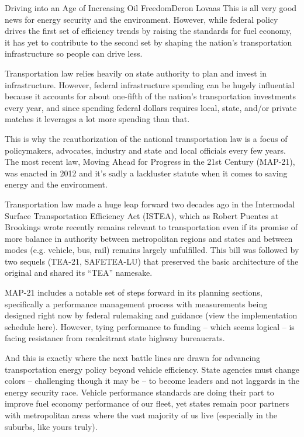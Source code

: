 \documentclass{papertex}
\begin{document}
\begin{news}{2}{Driving into an Age of Increasing Oil Freedom}{Deron Lovaas}{}{}
This is all very good news for energy security and the environment. However, 
while federal policy drives the first set of efficiency trends by raising the 
standards for fuel economy, it has yet to contribute to the second set by 
shaping the nation’s transportation infrastructure so people can drive less.

Transportation law relies heavily on state authority to plan and invest in 
infrastructure. However, federal infrastructure spending can be hugely 
influential because it accounts for about one-fifth of the nation’s 
transportation investments every year, and since spending federal dollars 
requires local, state, and/or private matches it leverages a lot more spending 
than that.

This is why the reauthorization of the national transportation law is a focus 
of policymakers, advocates, industry and state and local officials every few 
years. The most recent law, Moving Ahead for Progress in the 21st Century 
(MAP-21), was enacted in 2012 and it’s sadly a lackluster statute when it 
comes to saving energy and the environment.

Transportation law made a huge leap forward two decades ago in the Intermodal 
Surface Transportation Efficiency Act (ISTEA), which as Robert Puentes at 
Brookings wrote recently remains relevant to transportation even if its 
promise of more balance in authority between metropolitan regions and states 
and between modes (e.g. vehicle, bus, rail) remains largely unfulfilled. This 
bill was followed by two sequels (TEA-21, SAFETEA-LU) that preserved the basic 
architecture of the original and shared its “TEA” namesake.

MAP-21 includes a notable set of steps forward in its planning sections, 
specifically a performance management process with measurements being designed 
right now by federal rulemaking and guidance (view the implementation schedule 
here). However, tying performance to funding – which seems logical – is facing 
resistance from recalcitrant state highway bureaucrats.

And this is exactly where the next battle lines are drawn for advancing 
transportation energy policy beyond vehicle efficiency. State agencies must 
change colors – challenging though it may be – to become leaders and not 
laggards in the energy security race. Vehicle performance standards are doing 
their part to improve fuel economy performance of our fleet, yet states remain 
poor partners with metropolitan areas where the vast majority of us live 
(especially in the suburbs, like yours truly).


\end{news}
\end{document}
